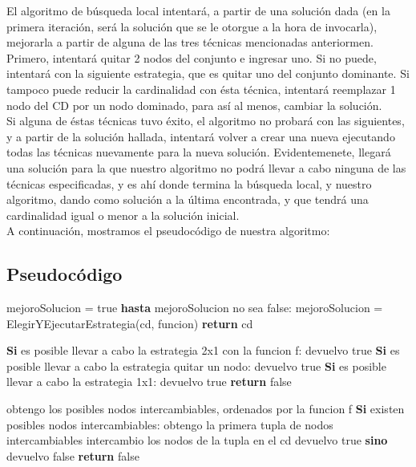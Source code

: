 El algoritmo de búsqueda local intentará, a partir de una solución dada (en la primera iteración, será la solución que se le otorgue a la hora de invocarla), mejorarla a partir de alguna de las tres técnicas mencionadas anteriormen. Primero, intentará quitar 2 nodos del conjunto e ingresar uno. Si no puede, intentará con la siguiente estrategia, que es quitar uno del conjunto dominante. Si tampoco puede reducir la cardinalidad con ésta técnica, intentará reemplazar 1 nodo del CD por un nodo dominado, para así al menos, cambiar la solución. \\
Si alguna de éstas técnicas tuvo éxito, el algoritmo no probará con las siguientes, y a partir de la solución hallada, intentará volver a crear una nueva ejecutando todas las técnicas nuevamente para la nueva solución. Evidentemenete, llegará una solución para la que nuestro algoritmo no podrá llevar a cabo ninguna de las técnicas especificadas, y es ahí donde termina la búsqueda local, y nuestro algoritmo, dando como solución a la última encontrada, y que tendrá una cardinalidad igual o menor a la solución inicial. \\
A continuación, mostramos el pseudocódigo de nuestra algoritmo:  \\

\subsection{Pseudocódigo}
\begin{codebox}
\li mejoroSolucion = true
\li	\textbf{hasta} mejoroSolucion no sea false: \Do
\li		mejoroSolucion = ElegirYEjecutarEstrategia(cd, funcion)
\End
\End
\li	\textbf{return} cd
\end{codebox}

\begin{codebox}
\li		\textbf{Si} es posible llevar a cabo la estrategia 2x1 con la funcion f: \Do
\li			devuelvo true
\End
\li		\textbf{Si} es posible llevar a cabo la estrategia quitar un nodo: \Do
\li			devuelvo true
\End
\li		\textbf{Si} es posible llevar a cabo la estrategia 1x1: \Do
\li			devuelvo true
\End
\li \textbf{return} false
\end{codebox}

\begin{codebox}
\li		obtengo los posibles nodos intercambiables, ordenados por la funcion f
\li		\textbf{Si} existen posibles nodos intercambiables: \Do
\li			obtengo la primera tupla de nodos intercambiables
\li			intercambio los nodos de la tupla en el cd
\li			devuelvo true
\li		\textbf{sino} devuelvo false
\End
\li \textbf{return} false
\end{codebox}

